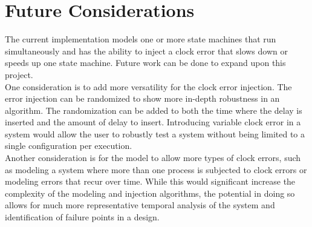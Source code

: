 \documentclass[12pt]{extarticle}
\begin{document}
\section{Future Considerations}

The current implementation models one or more state machines that run simultaneously and has the ability to inject a clock error that slows down or speeds up one state machine. Future work can be done to expand upon this project.\\

One consideration is to add more versatility for the clock error injection. The error injection can be randomized to show more in-depth robustness in an algorithm. The randomization can be added to both the time where the delay is inserted and the amount of delay to insert. Introducing variable clock error in a system would allow the user to robustly test a system without being limited to a single configuration per execution.\\

Another consideration is for the model to allow more types of clock errors, such as modeling a system where more than one process is subjected to clock errors or modeling errors that recur over time. While this would significant increase the complexity of the modeling and injection algorithms, the potential in doing so allows for much more representative temporal analysis of the system and identification of failure points in a design.
\end{document}
